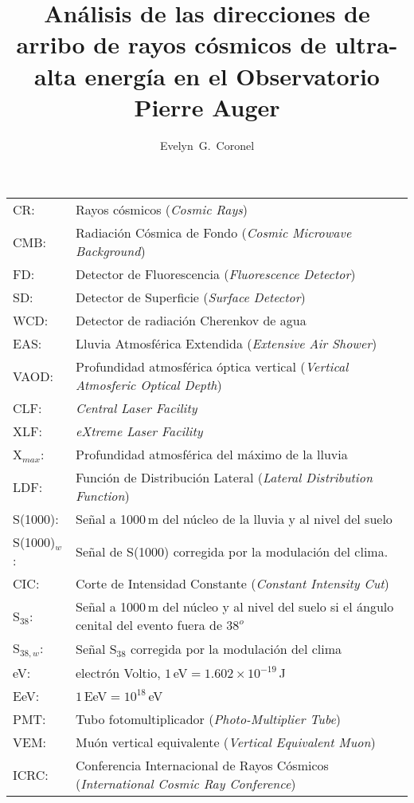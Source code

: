 \documentclass[12pt,papel,oneside]{ibtesis}
\title{Análisis de las direcciones de arribo de rayos cósmicos de ultra-alta energía en el Observatorio Pierre Auger}
\author{Evelyn~G.~Coronel}
\begin{document}
\begin{preliminary}


\begin{abreviaturas}

\begin{tabular}{l l}
CR: 		& Rayos cósmicos  (\emph{Cosmic Rays}) \\
CMB: 		& Radiación Cósmica de Fondo (\emph{Cosmic Microwave Background})\\
FD: 		& Detector de Fluorescencia (\emph{Fluorescence Detector}) \\
SD: 		& Detector de Superficie (\emph{Surface Detector})  \\
WCD: 		& Detector de radiación Cherenkov de agua\\
EAS: 		& Lluvia Atmosférica Extendida  (\emph{Extensive Air Shower})    \\
VAOD: 		& Profundidad atmosférica óptica vertical (\emph{Vertical Atmosferic Optical Depth})\\
CLF:		& \emph{Central Laser Facility}\\
XLF:		& \emph{eXtreme Laser Facility}\\
X$_{max}$: 	& Profundidad atmosférica del máximo de la lluvia \\
LDF: 		& Función de Distribución Lateral (\emph{Lateral Distribution Function}) \\
S(1000): 	& Señal a 1000\,m del núcleo de la lluvia y al nivel del suelo \\
S(1000)$_w$:& Señal de S(1000) corregida por la modulación del clima. \\
CIC: 		& Corte de Intensidad Constante (\emph{Constant Intensity Cut}) \\
S$_{38}$: 	& Señal a 1000\,m del núcleo y al nivel del suelo si el ángulo cenital del evento fuera de $38^o$\\
S$_{38,w}$: & Señal S$_{38}$ corregida por la modulación del clima \\
eV: 		& electrón Voltio, $1\,$eV$= 1.602\times 10^{-19}\,$J \\
EeV: 		& $1\,$EeV$=10^{18}\,$eV\\
PMT: 		& Tubo fotomultiplicador (\emph{Photo-Multiplier Tube})\\
VEM: 		& Muón vertical equivalente (\emph{Vertical Equivalent Muon})\\
ICRC: 		& Conferencia Internacional de Rayos Cósmicos (\emph{International Cosmic Ray Conference})\\
\end{tabular}
\end{abreviaturas}

	\tableofcontents                %
	\listoffigures                  %

	

\end{preliminary}
\end{document}
